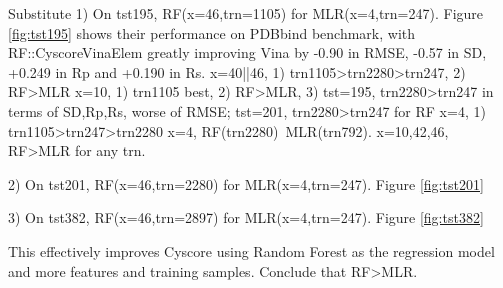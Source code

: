 \documentclass[journal=jacsat,manuscript=article]{achemso}
\begin{document}
Substitute
1) On tst195, RF(x=46,trn=1105) for MLR(x=4,trn=247). Figure \ref{fig:tst195} shows their performance on PDBbind benchmark, with RF::CyscoreVinaElem greatly improving Vina by -0.90 in RMSE, -0.57 in SD, +0.249 in Rp and +0.190 in Rs.
x=40||46, 1) trn1105>trn2280>trn247, 2) RF>MLR
x=10, 1) trn1105 best, 2) RF>MLR, 3) tst=195, trn2280>trn247 in terms of SD,Rp,Rs, worse of RMSE; tst=201, trn2280>trn247 for RF
x=4, 1) trn1105>trn247>trn2280
x=4, RF(trn2280)~MLR(trn792). x=10,42,46, RF>MLR for any trn.

2) On tst201, RF(x=46,trn=2280) for MLR(x=4,trn=247). Figure \ref{fig:tst201}

3) On tst382, RF(x=46,trn=2897) for MLR(x=4,trn=247). Figure \ref{fig:tst382}

This effectively improves Cyscore using Random Forest as the regression model and more features and training samples. Conclude that RF>MLR.
\end{document}
